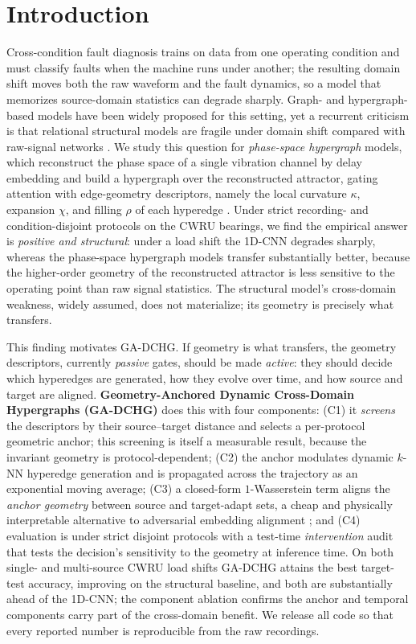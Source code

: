\section{Introduction}
\label{sec:intro}

Cross-condition fault diagnosis trains on data from one operating condition and
must classify faults when the machine runs under another; the resulting domain
shift moves both the raw waveform and the fault dynamics, so a model that
memorizes source-domain statistics can degrade sharply. Graph- and
hypergraph-based models \cite{li2021hg,li2021mrfcn,kipf2017,feng2019} have been
widely proposed for this setting, yet a recurrent criticism is that relational
structural models are fragile under domain shift compared with raw-signal
networks \cite{ince2016real,wen2018new,zhang2017new}. We study this question for
\emph{phase-space hypergraph} models, which reconstruct the phase space of a
single vibration channel by delay embedding \cite{takens1981,packard1980geometry,
fraser1986,kennel1992} and build a hypergraph over the reconstructed attractor,
gating attention with edge-geometry descriptors, namely the local curvature
$\kappa$, expansion $\chi$, and filling $\rho$ of each hyperedge \cite{grassberger1983}.
Under strict recording- and condition-disjoint protocols on the CWRU bearings, we
find the empirical answer is \emph{positive and structural}: under a load shift
the 1D-CNN degrades sharply, whereas the phase-space hypergraph models transfer
substantially better, because the higher-order geometry of the reconstructed
attractor is less sensitive to the operating point than raw signal statistics.
The structural model's cross-domain weakness, widely assumed, does not
materialize; its geometry is precisely what transfers.

This finding motivates GA-DCHG. If geometry is what transfers, the geometry
descriptors, currently \emph{passive} gates, should be made \emph{active}:
they should decide which hyperedges are generated, how they evolve over time, and
how source and target are aligned. \textbf{Geometry-Anchored Dynamic
Cross-Domain Hypergraphs (GA-DCHG)} does this with four components: (C1) it
\emph{screens} the descriptors by their source--target distance and selects a
per-protocol geometric anchor; this screening is itself a measurable result,
because the invariant geometry is protocol-dependent; (C2) the anchor modulates dynamic $k$-NN
hyperedge generation and is propagated across the trajectory as an exponential
moving average; (C3) a closed-form $1$-Wasserstein term aligns the
\emph{anchor geometry} between source and target-adapt sets, a cheap and
physically interpretable alternative to adversarial embedding alignment
\cite{ganin2016domain,arjovsky2017wgan,gretton2012kernel}; and (C4) evaluation is
under strict disjoint protocols with a test-time \emph{intervention} audit that
tests the decision's sensitivity to the geometry at inference time. On both single- and multi-source CWRU load shifts GA-DCHG attains the
best target-test accuracy, improving on the structural baseline, and both are
substantially ahead of the 1D-CNN; the component ablation confirms the anchor and
temporal components carry part of the cross-domain benefit. We release all code
so that every reported number is reproducible from the raw recordings.
